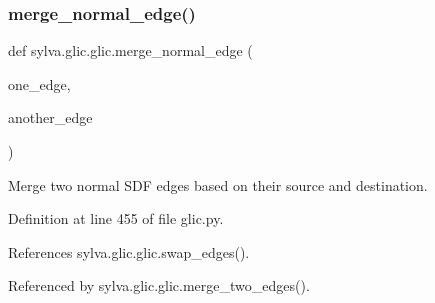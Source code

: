 \subsubsection{\texorpdfstring{merge\+\_\+normal\+\_\+edge()}{merge\_normal\_edge()}}
{\footnotesize\ttfamily def sylva.\+glic.\+glic.\+merge\+\_\+normal\+\_\+edge (\begin{DoxyParamCaption}\item[{}]{one\+\_\+edge,  }\item[{}]{another\+\_\+edge }\end{DoxyParamCaption})}

\begin{DoxyVerb}  Merge two normal SDF edges
  based on their source and destination.
\end{DoxyVerb}
 

Definition at line 455 of file glic.\+py.



References sylva.\+glic.\+glic.\+swap\+\_\+edges().



Referenced by sylva.\+glic.\+glic.\+merge\+\_\+two\+\_\+edges().


